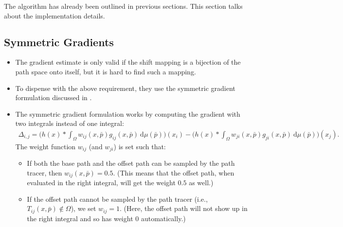 \documentclass[10pt]{article}
\newcommand{\dee}{\mathrm{d}}
\begin{document}
  The algorithm has already been outlined in previous sections.  This section talks about the implementation details.  	
  
  \subsection{Symmetric Gradients}
  
  \begin{itemize}
  	\item The gradient estimate is only valid if the shift mapping is a bijection of the path space onto itself, but it is hard to find such a mapping.

  	\item To dispense with the above requirement, they use the symmetric gradient formulation discussed in \cite{Manzi:2014}.

  	\item The symmetric gradient formulation works by computing the gradient with two integrals instead of one integral:
  	\begin{align*}
  		\Delta_{i,j} = \bigg( h(x) * \int_\Omega w_{ij}(x, \bar p) g_{ij}(x, \bar p)\ \dee\mu(\bar p)\bigg) (x_i) - \bigg( h(x) * \int_\Omega w_{ji}(x, \bar p) g_{ji}(x, \bar p)\ \dee\mu(\bar p)\bigg) (x_j).
  	\end{align*}
  	The weight function $w_{ij}$ (and $w_{ji}$) is set such that:
  	\begin{itemize}
  		\item  If both the base path and the offset path can be sampled by the path tracer, then $w_{ij}(x, \bar p) = 0.5$.  (This means that the offset path, when evaluated in the right integral, will get the weight $0.5$ as well.)
  		\item If the offset path cannot be sampled by the path tracer (i.e., $T_{ij}(x, \bar p) \not\in \Omega$), we set $w_{ij} = 1$.  (Here, the offset path will not show up in the right integral and so has weight $0$ automatically.)
  	\end{itemize}
  \end{itemize}
\end{document}
